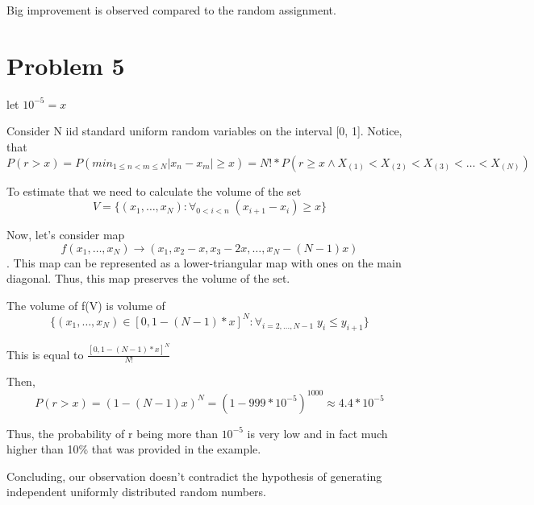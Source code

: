 \documentclass{article}
\begin{document}
Big improvement is observed compared to the random assignment.


\section{Problem 5}

let $10^{-5} = x$

Consider N iid standard uniform random variables on the interval [0, 1]. Notice, that \[ P(r > x) = P(min_{1 \le n < m \le N}|x_n - x_m| \ge x) = N! * P(r \ge x \land X_{(1)} < X_{(2)} < X_{(3)} < \dots < X_{(N)}) \]

To estimate that we need to calculate the volume of the set  \[ V =  \{(x_1, \dots, x_N): \forall_{0 < i < n} \; (x_{i+1} - x_{i}) \ge x\} \]

Now, let's consider map \[f (x_1, \dots, x_N) \rightarrow (x_1, x_2 - x, x_3 - 2x, \dots, x_N - (N-1)x) \]. This map can be represented as a lower-triangular map with ones on the main diagonal. Thus, this map preserves the volume of the set.

The volume of f(V) is volume of \[ \{(x_1, \dots, x_N) \in [0, 1 - (N-1)*x]^N: \forall_{i=2, \dots, N-1} \; y_i \le y_{i+1} \} \]

This is equal to $\frac{[0, 1 - (N-1)*x]^N}{N!}$

Then, \[ P(r > x) = (1-(N-1)x)^{N} = (1 - 999*10^{-5})^{1000} \approx 4.4*10^{-5} \] 

Thus, the probability of r being more than $10^{-5}$ is very low and in fact much higher than 10\% that was provided in the example.  

Concluding, our observation doesn't contradict the hypothesis of generating independent uniformly distributed random numbers.
\end{document}
